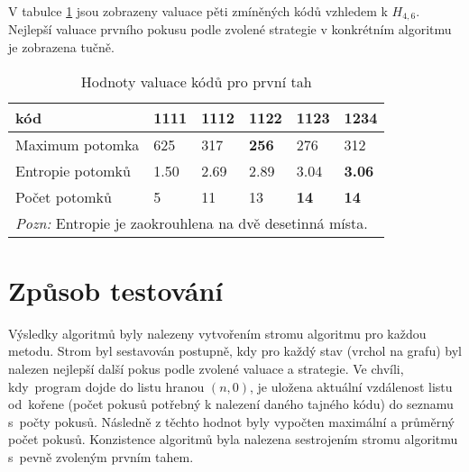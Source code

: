
V tabulce \ref{tabvaluaceprvnichtahu} jsou zobrazeny valuace pěti zmíněných kódů vzhledem k $H_{4,6}$. Nejlepší valuace prvního pokusu podle zvolené strategie v konkrétním algoritmu je zobrazena tučně. 


\begin{table}[h]
\centering
\begin{tabular}{l l l l l l}
\toprule
kód & 1111 & 1112 & 1122 & 1123 & 1234 \\
\midrule

Maximum potomka & 625 & 317 & \textbf{256} & 276 & 312 \\
Entropie potomků & 1.50 & 2.69 & 2.89 & 3.04 & \textbf{3.06}\\




Počet potomků & 5 & 11 & 13 & \textbf{14} & \textbf{14} \\

\bottomrule
\multicolumn{6}{l}{\footnotesize \textit{Pozn:}
Entropie je zaokrouhlena na dvě desetinná místa.
}

\end{tabular}
\caption{Hodnoty valuace kódů pro první tah}
\label{tabvaluaceprvnichtahu}
\end{table}



\section{Způsob testování}
Výsledky algoritmů byly nalezeny vytvořením stromu algoritmu pro každou metodu. Strom byl sestavován postupně, kdy pro každý stav (vrchol na grafu) byl nalezen nejlepší další pokus podle zvolené valuace a strategie. Ve chvíli, kdy~program dojde do listu hranou $(n,0)$, je uložena aktuální vzdálenost listu od~kořene (počet pokusů potřebný k nalezení daného tajného kódu) do seznamu s~počty pokusů. 
Následně z těchto hodnot byly vypočten maximální a průměrný počet pokusů. Konzistence algoritmů byla nalezena sestrojením stromu algoritmu s~pevně zvoleným prvním tahem.

